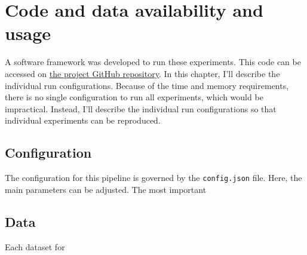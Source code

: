 \chapter{Code and data availability and usage}

A software framework was developed to run these experiments. This code can be accessed on \href{https://github.com/eleniel-mocna/Refined}{the project GitHub repository}. In this chapter, I'll describe the individual run configurations. Because of the time and memory requirements, there is no single configuration to run all experiments, which would be impractical. Instead, I'll describe the individual run configurations so that individual experiments can be reproduced.

\section{Configuration}

The configuration for this pipeline is governed by the \texttt{config.json} file. Here, the main parameters can be adjusted. The most important

\section{Data}

Each dataset for 